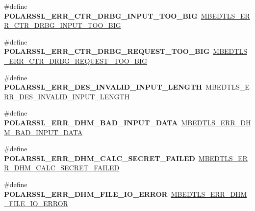 \begin{DoxyCompactItemize}
\#define {\bfseries P\+O\+L\+A\+R\+S\+S\+L\+\_\+\+E\+R\+R\+\_\+\+C\+T\+R\+\_\+\+D\+R\+B\+G\+\_\+\+I\+N\+P\+U\+T\+\_\+\+T\+O\+O\+\_\+\+B\+IG}~\mbox{\hyperlink{ctr__drbg_8h_a7367c2feaa7ee9f4f182ff1cb03a864e}{M\+B\+E\+D\+T\+L\+S\+\_\+\+E\+R\+R\+\_\+\+C\+T\+R\+\_\+\+D\+R\+B\+G\+\_\+\+I\+N\+P\+U\+T\+\_\+\+T\+O\+O\+\_\+\+B\+IG}}
\item 
\mbox{\label{compat-1_83_8h_a4ec9724247956f9b2004beb3998cbf4b}} 
\#define {\bfseries P\+O\+L\+A\+R\+S\+S\+L\+\_\+\+E\+R\+R\+\_\+\+C\+T\+R\+\_\+\+D\+R\+B\+G\+\_\+\+R\+E\+Q\+U\+E\+S\+T\+\_\+\+T\+O\+O\+\_\+\+B\+IG}~\mbox{\hyperlink{ctr__drbg_8h_aea1a5c82ce0f69dfdda2d3131bd1b5e1}{M\+B\+E\+D\+T\+L\+S\+\_\+\+E\+R\+R\+\_\+\+C\+T\+R\+\_\+\+D\+R\+B\+G\+\_\+\+R\+E\+Q\+U\+E\+S\+T\+\_\+\+T\+O\+O\+\_\+\+B\+IG}}
\item 
\mbox{\label{compat-1_83_8h_abd97773a4916e7ba50ad66dc77719bac}} 
\#define {\bfseries P\+O\+L\+A\+R\+S\+S\+L\+\_\+\+E\+R\+R\+\_\+\+D\+E\+S\+\_\+\+I\+N\+V\+A\+L\+I\+D\+\_\+\+I\+N\+P\+U\+T\+\_\+\+L\+E\+N\+G\+TH}~M\+B\+E\+D\+T\+L\+S\+\_\+\+E\+R\+R\+\_\+\+D\+E\+S\+\_\+\+I\+N\+V\+A\+L\+I\+D\+\_\+\+I\+N\+P\+U\+T\+\_\+\+L\+E\+N\+G\+TH
\item 
\mbox{\label{compat-1_83_8h_ab1f102e6347b0cc8c49d525964d7c996}} 
\#define {\bfseries P\+O\+L\+A\+R\+S\+S\+L\+\_\+\+E\+R\+R\+\_\+\+D\+H\+M\+\_\+\+B\+A\+D\+\_\+\+I\+N\+P\+U\+T\+\_\+\+D\+A\+TA}~\mbox{\hyperlink{dhm_8h_aed8709aee853dc12b0ed69980dd05ac9}{M\+B\+E\+D\+T\+L\+S\+\_\+\+E\+R\+R\+\_\+\+D\+H\+M\+\_\+\+B\+A\+D\+\_\+\+I\+N\+P\+U\+T\+\_\+\+D\+A\+TA}}
\item 
\mbox{\label{compat-1_83_8h_ab4f6609fa29638c85e6d401954d02845}} 
\#define {\bfseries P\+O\+L\+A\+R\+S\+S\+L\+\_\+\+E\+R\+R\+\_\+\+D\+H\+M\+\_\+\+C\+A\+L\+C\+\_\+\+S\+E\+C\+R\+E\+T\+\_\+\+F\+A\+I\+L\+ED}~\mbox{\hyperlink{dhm_8h_a24f4983888eefb427e2bd10a5fa4e608}{M\+B\+E\+D\+T\+L\+S\+\_\+\+E\+R\+R\+\_\+\+D\+H\+M\+\_\+\+C\+A\+L\+C\+\_\+\+S\+E\+C\+R\+E\+T\+\_\+\+F\+A\+I\+L\+ED}}
\item 
\mbox{\label{compat-1_83_8h_aebb6ccd367ebc3306b71fd214530c2c2}} 
\#define {\bfseries P\+O\+L\+A\+R\+S\+S\+L\+\_\+\+E\+R\+R\+\_\+\+D\+H\+M\+\_\+\+F\+I\+L\+E\+\_\+\+I\+O\+\_\+\+E\+R\+R\+OR}~\mbox{\hyperlink{dhm_8h_a9398d77c460671c8fa2a79be8cbf459e}{M\+B\+E\+D\+T\+L\+S\+\_\+\+E\+R\+R\+\_\+\+D\+H\+M\+\_\+\+F\+I\+L\+E\+\_\+\+I\+O\+\_\+\+E\+R\+R\+OR}}

\end{DoxyCompactItemize}
